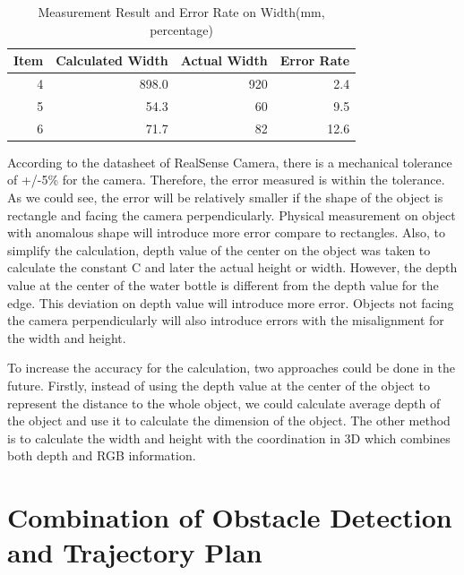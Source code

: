 \documentclass[
  oneside]{ubcthesis}
\begin{document}
\begin{table}

\caption{\label{tab:mytable5}Measurement Result and Error Rate on Width(mm, percentage)}
\centering
\begin{tabular}[t]{rrrr}
\toprule
Item & Calculated Width & Actual Width & Error Rate\\
\midrule
4 & 898.0 & 920 & 2.4\\
5 & 54.3 & 60 & 9.5\\
6 & 71.7 & 82 & 12.6\\
\bottomrule
\end{tabular}
\end{table}

According to the datasheet \citep{realSenseD400} of RealSense Camera, there is a mechanical tolerance of +/-5\% for the camera. Therefore, the error measured is within the tolerance. As we could see, the error will be relatively smaller if the shape of the object is rectangle and facing the camera perpendicularly. Physical measurement on object with anomalous shape will introduce more error compare to rectangles. Also, to simplify the calculation, depth value of the center on the object was taken to calculate the constant C and later the actual height or width. However, the depth value at the center of the water bottle is different from the depth value for the edge. This deviation on depth value will introduce more error. Objects not facing the camera perpendicularly will also introduce errors with the misalignment for the width and height.

To increase the accuracy for the calculation, two approaches could be done in the future. Firstly, instead of using the depth value at the center of the object to represent the distance to the whole object, we could calculate average depth of the object and use it to calculate the dimension of the object. The other method is to calculate the width and height with the coordination in 3D which combines both depth and RGB information.

\hypertarget{combination-of-obstacle-detection-and-trajectory-plan}{%
\section{Combination of Obstacle Detection and Trajectory Plan}\label{combination-of-obstacle-detection-and-trajectory-plan}}
\end{document}
